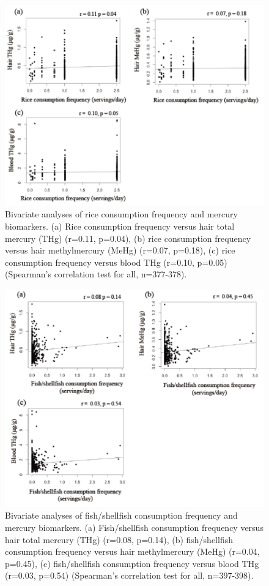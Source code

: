 \begin{figure}
  \centering
    \label{fig:Fig211}
  \includegraphics[scale=1]{Figures/Fig211.pdf}
  \caption[Bivariate analyses of rice consumption frequency and mercury biomarkers]{Bivariate analyses of rice consumption frequency and mercury biomarkers. (a) Rice consumption frequency versus hair total mercury (THg) (r=0.11, p=0.04), (b) rice consumption frequency versus hair methylmercury (MeHg) (r=0.07, p=0.18), (c) rice consumption frequency versus blood THg (r=0.10, p=0.05) (Spearman's correlation test for all, n=377-378).}
\end{figure}

\begin{figure}
  \centering
    \label{fig:Fig212}
  \includegraphics[scale=1]{Figures/Fig212.pdf}
  \caption[Bivariate analyses of fish/shellfish consumption frequency and mercury biomarkers]{Bivariate analyses of fish/shellfish consumption frequency and mercury biomarkers. (a) Fish/shellfish consumption frequency versus hair total mercury (THg) (r=0.08, p=0.14), (b) fish/shellfish consumption frequency versus hair methylmercury (MeHg) (r=0.04, p=0.45), (c) fish/shellfish consumption frequency versus blood THg (r=0.03, p=0.54) (Spearman's correlation test for all, n=397-398).}
\end{figure}

